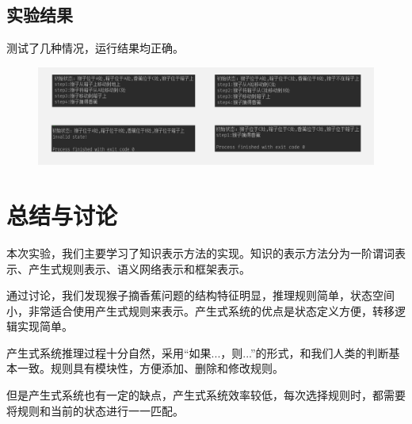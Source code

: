 \subsection{实验结果}
\par 测试了几种情况，运行结果均正确。
\begin{figure}[H]
  \centering
  \includegraphics[scale=0.7]{1.png}
\end{figure}


\section{总结与讨论}
\par 本次实验，我们主要学习了知识表示方法的实现。知识的表示方法分为一阶谓词表示、产生式规则表示、语义网络表示和框架表示。
\par 通过讨论，我们发现猴子摘香蕉问题的结构特征明显，推理规则简单，状态空间小，非常适合使用产生式规则来表示。产生式系统的优点是状态定义方便，转移逻辑实现简单。
\par 产生式系统推理过程十分自然，采用“如果...，则...”的形式，和我们人类的判断基本一致。规则具有模块性，方便添加、删除和修改规则。
\par 但是产生式系统也有一定的缺点，产生式系统效率较低，每次选择规则时，都需要将规则和当前的状态进行一一匹配。


